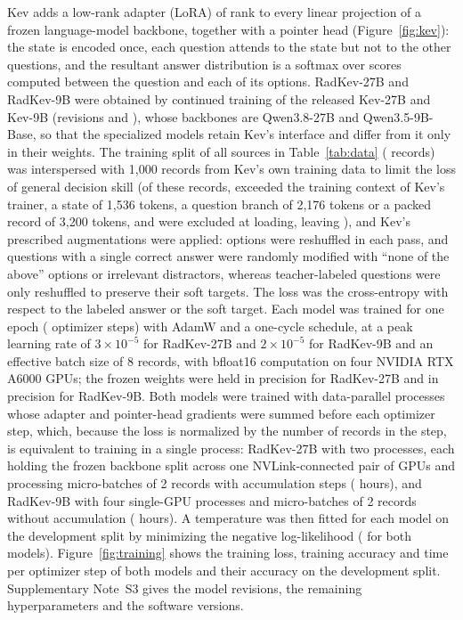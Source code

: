\documentclass[11pt]{article}
\begin{document}
Kev \citep{palmer2026kev} adds a low-rank adapter (LoRA) \citep{hu2022lora} of rank  to every linear projection of a frozen language-model backbone, together with a pointer head \citep{vinyals2015pointer} (Figure~\ref{fig:kev}): the state is encoded once, each question attends to the state but not to the other questions, and the resultant answer distribution is a softmax over scores computed between the question and each of its options. RadKev-27B and RadKev-9B were obtained by continued training of the released Kev-27B and Kev-9B (revisions  and ), whose backbones are Qwen3.8-27B and Qwen3.5-9B-Base, so that the specialized models retain Kev's interface and differ from it only in their weights. The training split of all sources in Table~\ref{tab:data} ( records) was interspersed with 1,000 records from Kev's own training data to limit the loss of general decision skill (of these  records,  exceeded the training context of Kev's trainer, a state of 1,536 tokens, a question branch of 2,176 tokens or a packed record of 3,200 tokens, and were excluded at loading, leaving ), and Kev's prescribed augmentations were applied: options were reshuffled in each pass, and questions with a single correct answer were randomly modified with ``none of the above'' options or irrelevant distractors, whereas teacher-labeled questions were only reshuffled to preserve their soft targets. The loss was the cross-entropy with respect to the labeled answer or the soft target. Each model was trained for one epoch ( optimizer steps) with AdamW and a one-cycle schedule, at a peak learning rate of $3\times10^{-5}$ for RadKev-27B and $2\times10^{-5}$ for RadKev-9B and an effective batch size of 8 records, with bfloat16 computation on four NVIDIA RTX A6000 GPUs; the frozen weights were held in  precision for RadKev-27B and in  precision for RadKev-9B. Both models were trained with data-parallel processes whose adapter and pointer-head gradients were summed before each optimizer step, which, because the loss is normalized by the number of records in the step, is equivalent to training in a single process: RadKev-27B with two processes, each holding the frozen backbone split across one NVLink-connected pair of GPUs and processing micro-batches of 2 records with  accumulation steps ( hours), and RadKev-9B with four single-GPU processes and micro-batches of 2 records without accumulation ( hours). A temperature was then fitted for each model on the development split by minimizing the negative log-likelihood \citep{guo2017calibration} ( for both models). Figure~\ref{fig:training} shows the training loss, training accuracy and time per optimizer step of both models and their accuracy on the development split. Supplementary Note~S3 gives the model revisions, the remaining hyperparameters and the software versions.
\end{document}
